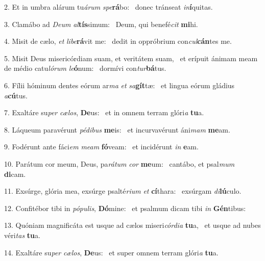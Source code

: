 2. Et in umbra alárum tu\textit{á}\textit{rum} \textit{spe}\textbf{rá}bo: \ast\  donec tránseat \textit{in}\textbf{í}quitas.\

3. Clamábo ad \textit{De}\textit{um} \textit{al}\textbf{tís}simum: \ast\  Deum, qui benefé\textit{cit} \textbf{mi}hi.\

4. Misit de cælo, \textit{et} \textit{li}\textit{be}\textbf{rá}vit me: \ast\  dedit in oppróbrium con\textit{cul}\textbf{cán}tes me.\

5. Misit Deus misericórdiam suam, et veritátem suam, \dag\  et erípuit ánimam meam de médio catu\textit{ló}\textit{rum} \textit{le}\textbf{ó}num: \ast\  dormívi con\textit{tur}\textbf{bá}tus.\

6. Fílii hóminum dentes eórum ar\textit{ma} \textit{et} \textit{sa}\textbf{gít}tæ: \ast\  et lingua eórum gládius \textit{a}\textbf{cú}tus.\

7. Exaltáre su\textit{per} \textit{cæ}\textit{los}, \textbf{De}us: \ast\  et in omnem terram glóri\textit{a} \textbf{tu}a.\

8. Láqueum paravérunt \textit{pé}\textit{di}\textit{bus} \textbf{me}is: \ast\  et incurvavérunt áni\textit{mam} \textbf{me}am.\

9. Fodérunt ante fáci\textit{em} \textit{me}\textit{am} \textbf{fó}veam: \ast\  et incidérunt \textit{in} \textbf{e}am.\

10. Parátum cor meum, Deus, pa\textit{rá}\textit{tum} \textit{cor} \textbf{me}um: \ast\  cantábo, et psal\textit{mum} \textbf{di}cam.\

11. Exsúrge, glória mea, exsúrge psalté\textit{ri}\textit{um} \textit{et} \textbf{cí}thara: \ast\  exsúrgam \textit{di}\textbf{lú}culo.\

12. Confitébor tibi in \textit{pó}\textit{pu}\textit{lis}, \textbf{Dó}mine: \ast\  et psalmum dicam tibi \textit{in} \textbf{Gén}tibus:\

13. Quóniam magnificáta est usque ad cælos miseri\textit{cór}\textit{di}\textit{a} \textbf{tu}a, \ast\  et usque ad nubes véri\textit{tas} \textbf{tu}a.\

14. Exaltáre su\textit{per} \textit{cæ}\textit{los}, \textbf{De}us: \ast\  et super omnem terram glóri\textit{a} \textbf{tu}a.\

